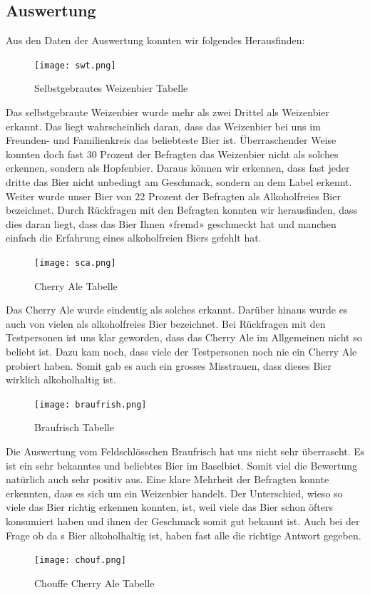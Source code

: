\newpage
\subsection{Auswertung}
Aus den Daten der Auswertung konnten wir folgendes Herausfinden:
\begin{figure}[!h]
	\centering
	\texttt{[image: swt.png]}
	\caption{Selbstgebrautes Weizenbier Tabelle}
\end{figure}
Das selbstgebraute Weizenbier wurde mehr als zwei Drittel als Weizenbier erkannt. Das liegt wahrscheinlich daran, dass das Weizenbier bei uns im Freunden- und Familienkreis das beliebteste Bier ist. Überraschender Weise konnten doch fast 30 Prozent der Befragten das Weizenbier nicht als solches erkennen,
 sondern als Hopfenbier. Daraus können wir erkennen, dass fast jeder dritte das Bier nicht unbedingt am Geschmack, sondern an dem Label erkennt. Weiter wurde unser Bier von 22 Prozent der Befragten als Alkoholfreies Bier bezeichnet. Durch Rückfragen mit den Befragten konnten wir herausfinden,
 dass dies daran liegt, dass das Bier Ihnen «fremd» geschmeckt hat und manchen einfach die Erfahrung eines alkoholfreien Biers gefehlt hat.
 \begin{figure}[!h]
	\centering
	\texttt{[image: sca.png]}
	\caption{Cherry Ale Tabelle}
\end{figure}
Das Cherry Ale wurde eindeutig als solches erkannt.
 Darüber hinaus wurde es auch von vielen als alkoholfreies Bier bezeichnet. Bei Rückfragen mit den Testpersonen ist uns klar geworden, dass das Cherry Ale im Allgemeinen nicht so beliebt ist. Dazu kam noch, dass viele der Testpersonen noch nie ein Cherry Ale probiert haben. Somit gab es auch ein grosses Misstrauen, dass dieses Bier wirklich alkoholhaltig ist.
 \begin{figure}[!h]
	\centering
	\texttt{[image: braufrish.png]}
	\caption{Braufrisch Tabelle}
\end{figure}
Die Auswertung vom Feldschlösschen Braufrisch hat uns nicht sehr überrascht. Es ist ein sehr bekanntes und beliebtes Bier im Baselbiet. Somit viel die Bewertung natürlich auch sehr positiv aus. Eine klare Mehrheit der Befragten konnte erkennten, dass es sich um ein Weizenbier handelt. Der Unterschied, wieso so viele das Bier richtig erkennen konnten, ist, weil viele das Bier schon öfters konsumiert haben und ihnen der Geschmack somit gut bekannt ist. Auch bei der Frage ob da
s Bier alkoholhaltig ist, haben fast alle die richtige Antwort gegeben. 
\begin{figure}[!h]
	\centering
	\texttt{[image: chouf.png]}
	\caption{Chouffe Cherry Ale Tabelle}
\end{figure}
